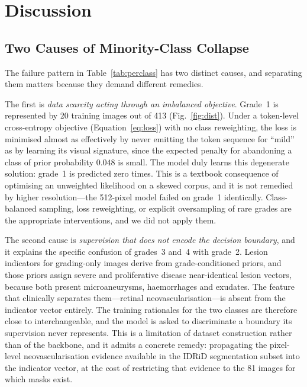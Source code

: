 \documentclass[conference]{IEEEtran}
\begin{document}
\section{Discussion}
\label{sec:discussion}

\subsection{Two Causes of Minority-Class Collapse}
The failure pattern in Table~\ref{tab:perclass} has two distinct causes, and
separating them matters because they demand different remedies.

The first is \emph{data scarcity acting through an imbalanced objective}. Grade~1
is represented by 20 training images out of 413 (Fig.~\ref{fig:dist}). Under a
token-level cross-entropy objective (Equation~\eqref{eq:loss}) with no class
reweighting, the loss is minimised almost as effectively by never emitting the
token sequence for ``mild'' as by learning its visual signature, since the
expected penalty for abandoning a class of prior probability $0.048$ is small.
The model duly learns this degenerate solution: grade~1 is predicted zero times.
This is a textbook consequence of optimising an unweighted likelihood on a skewed
corpus, and it is not remedied by higher resolution---the 512-pixel model failed
on grade~1 identically. Class-balanced sampling, loss reweighting, or explicit
oversampling of rare grades are the appropriate interventions, and we did not
apply them.

The second cause is \emph{supervision that does not encode the decision
boundary}, and it explains the specific confusion of grades~3 and~4 with grade~2.
Lesion indicators for grading-only images derive from grade-conditioned priors,
and those priors assign severe and proliferative disease near-identical lesion
vectors, because both present microaneurysms, haemorrhages and exudates. The
feature that clinically separates them---retinal neovascularisation---is absent
from the indicator vector entirely. The training rationales for the two classes
are therefore close to interchangeable, and the model is asked to discriminate a
boundary its supervision never represents. This is a limitation of dataset
construction rather than of the backbone, and it admits a concrete remedy:
propagating the pixel-level neovascularisation evidence available in the IDRiD
segmentation subset into the indicator vector, at the cost of restricting that
evidence to the 81 images for which masks exist.
\end{document}
